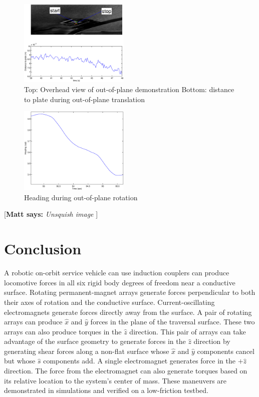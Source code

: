 \documentclass[letterpaper, 10 pt, conference]{ieeeconf}  %
\newcommand{\matt}[1]{{\color{darkgreen}\small\par {[{\bf Matt says:} {\em #1}} ] \\    }}
\begin{document}
         \begin{figure}[thpb]
      \centering
      \includegraphics[width = 0.47\textwidth]{figures/oop_translation.eps}
      \caption{Top: Overhead view of out-of-plane demonstration Bottom: distance to plate during out-of-plane translation}
      \label{fig:ooptranslation}
   \end{figure}
   
      
         \begin{figure}[thpb]
      \centering
      \includegraphics[width = 0.47\textwidth]{figures/oop_rotation_heading.eps}
      \caption{Heading during out-of-plane rotation}
      \label{fig:ooprotation}
   \end{figure}

  \matt{Unsquish image}


\section{Conclusion}
A robotic on-orbit service vehicle can use induction couplers can produce locomotive forces in all six rigid body degrees of freedom near a conductive surface. Rotating permanent-magnet arrays generate forces perpendicular to both their axes of rotation and the conductive surface. Current-oscillating electromagnets generate forces directly away from the surface. A pair of rotating arrays can produce $\hat{x}$ and $\hat{y}$ forces in the plane of the traversal surface. These two arrays can also produce torques in the $\hat{z}$ direction. This pair of arrays can take advantage of the surface geometry to generate forces in the $\hat{z}$ direction by generating shear forces along a non-flat surface whose $\hat{x}$ and $\hat{y}$ components cancel but whose $\hat{s}$ components add. A single electromagnet generates force in the $+\hat{z}$ direction. The force from the electromagnet can also generate torques based on its relative location to the system's center of mass. These maneuvers are demonstrated in simulations and verified on a low-friction testbed.  
\end{document}
